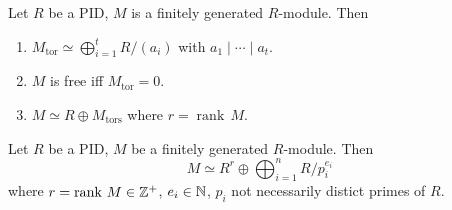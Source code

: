 \begin{cor}
    Let $R$ be a PID, $M$ is a finitely generated $R$-module. Then
    \begin{enumerate}[label=\arabic*)]
        \item $M_{\text{tor} }\simeq \bigoplus _{i=1}^t R /(a_i )$ with $a_1  \mid \cdots  \mid a_t $.
        \item $M$ is free iff $M_{\text{tor}} =0$.
        \item $M\simeq R\oplus M_{\text{tors} } $ where $r=\operatorname{rank}\, M$.
    \end{enumerate}
\end{cor}
\begin{theorem}
    Let $R$ be a PID, $M$ be a finitely generated $R$-module. Then \[
    M \simeq R^r \oplus \bigoplus _{i=1}^n  R / p_i ^{e_i }
    \] where $r= \operatorname{rank}\, M\in \mathbb{Z}^+$, $e_i  \in \mathbb{N}$, $p_i $ not necessarily distict primes of $R$.
\end{theorem}


